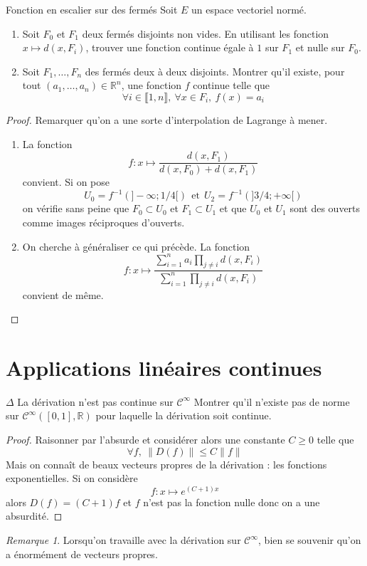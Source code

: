 \documentclass[french,a4paper]{article}
\newcommand{\R}{\mathbb{R}}
\newcommand{\inv}{^{-1}}
\theoremstyle{plain}
\theoremstyle{definition}
\theoremstyle{remark}
\newtheorem*{rmq}{Remarque}
\begin{document}
\begin{ex}{Fonction en escalier sur des fermés}
	Soit $E$ un espace vectoriel normé.
	\begin{enumerate}
		\item Soit $F_0$ et $F_1$ deux fermés disjoints non vides. En utilisant les fonction $x\mapsto d(x,F_i)$, trouver une fonction continue égale à $1$ sur $F_1$ et nulle sur $F_0$.
		\item Soit $F_1,\ldots,F_n$ des fermés deux à deux disjoints. Montrer qu'il existe, pour tout $(a_1,\ldots,a_n)\in\R^n$, une fonction $f$ continue telle que $$\forall i\in\llbracket1,n\rrbracket,\ \forall x\in F_i,\ f(x)=a_i$$
	\end{enumerate}
\end{ex}
\begin{proof}
	Remarquer qu'on a une sorte d'interpolation de Lagrange à mener.
	\begin{enumerate}
		\item La fonction $$f:x\mapsto\frac{d(x,F_1)}{d(x,F_0)+d(x,F_1)}$$ convient. Si on pose $$U_0=f\inv\left(]-\infty ;1/4[\right) \ \ \text{et} \ \ U_2=f\inv\left(]3/4;+\infty[\right)$$ on vérifie sans peine que $F_0\subset U_0$ et $F_1\subset U_1$ et que $U_0$ et $U_1$ sont des ouverts comme images réciproques d'ouverts.
		\item On cherche à généraliser ce qui précède. La fonction $$f:x\mapsto\frac{\sum_{i=1}^{n}a_i\prod_{j\ne i}d(x,F_i)}{\sum_{i=1}^{n}\prod_{j\ne i}d(x,F_i)}$$ convient de même.
	\end{enumerate}
\end{proof}

\section{Applications linéaires continues}

\begin{ex}{$\Delta$ La dérivation n'est pas continue sur $\mathcal{C}^\infty$}
	Montrer qu'il n'existe pas de norme sur $\mathcal{C}^{\infty}([0,1],\R)$ pour laquelle la dérivation soit continue.
\end{ex}
\begin{proof}
	Raisonner par l'absurde et considérer alors une constante $C\geqslant 0$ telle que $$\forall f,\ \lVert D(f)\rVert\leqslant C\lVert f\rVert$$ Mais on connaît de beaux vecteurs propres de la dérivation : les fonctions exponentielles. Si on considère $$f:x\mapsto e^{(C+1)x}$$ alors $D(f)=(C+1)f$ et $f$ n'est pas la fonction nulle donc on a une absurdité.
\end{proof}
\begin{rmq}
	Lorsqu'on travaille avec la dérivation sur $\mathcal{C}^\infty$, bien se souvenir qu'on a énormément de vecteurs propres.
\end{rmq}
\end{document}

